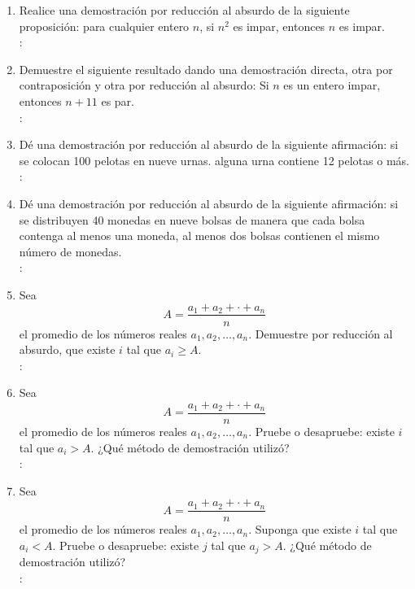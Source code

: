 \begin{enumerate}[label=0.1.\arabic*]
	\item Realice una demostración por reducción al absurdo de la siguiente proposición: para cualquier entero $ n $, si $ n^2 $ es impar, entonces $ n $ es impar. \\
	\solucion: \\
	
	\item Demuestre el siguiente resultado dando una demostración directa, otra por contraposición y otra por reducción al absurdo: Si $ n $ es un entero impar, entonces $ n + 11 $ es par. \\
	\solucion: \\
	
	\item Dé una demostración por reducción al absurdo  de la siguiente afirmación: si se colocan 100 pelotas en nueve urnas. alguna urna contiene 12 pelotas o más. \\
	\solucion: \\
	
	\item Dé una demostración por reducción al absurdo de la siguiente afirmación: si se distribuyen 40 monedas en nueve bolsas de manera que cada bolsa contenga al menos una moneda, al menos dos bolsas contienen el mismo número de monedas. \\
	\solucion: \\
	
	\item Sea
	\[ A = \frac{a_1 + a_2 + \cdot + a_n}{n} \]
	el promedio de los números reales $ a_1, a_2, \ldots, a_n $. Demuestre por reducción al absurdo, que existe $ i $ tal que $ a_i \geq A $. \\
	\solucion: \\
	
	\item Sea
	\[ A = \frac{a_1 + a_2 + \cdot + a_n}{n} \]
	el promedio de los números reales $ a_1, a_2, \ldots, a_n $. Pruebe o desapruebe: existe $ i $ tal que $ a_i > A $. ¿Qué método de demostración utilizó? \\
	\solucion: \\
	
	\item Sea
	\[ A = \frac{a_1 + a_2 + \cdot + a_n}{n} \]
	el promedio de los números reales $ a_1, a_2, \ldots, a_n $. Suponga que existe $ i $ tal que $ a_i < A $. Pruebe o desapruebe: existe $ j $ tal que $ a_j > A $. ¿Qué método de demostración utilizó? \\
	\solucion: \\
	

\end{enumerate}
